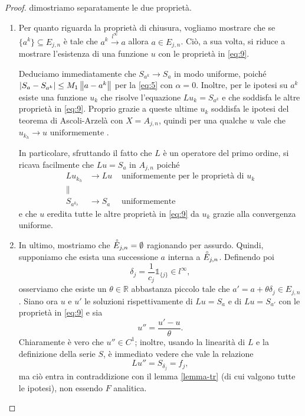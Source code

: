 \newpage
\begin{proof} 
dimostriamo separatamente le due proprietà.
\begin{enumerate}
\item
Per quanto riguarda la proprietà di chiusura, vogliamo mostrare che se $\{a^k\}\subseteq E_{j,n}$ è tale che $a^k \xrightarrow{l^\infty} a$ allora $a \in E_{j,n}$. Ciò, a sua volta, si riduce a mostrare l'esistenza di una funzione $u$ con le proprietà in \eqref{eq:9}.

Deduciamo immediatamente che $S_{a^k} \rightarrow S_a$ in modo uniforme, poiché $\left|S_a - S_{a^k}\right| \leq M_1 \left\lVert a-a^k\right\rVert$ per la \eqref{eq:5} con $\alpha = 0$. Inoltre, per le ipotesi su $a^k$ esiste una funzione $u_k$ che risolve l'equazione $Lu_k=S_{a^k}$ e che soddisfa le altre proprietà in \eqref{eq:9}. Proprio grazie a queste ultime $u_k$ soddisfa le ipotesi del teorema di Ascoli-Arzelà con $X=A_{j,n}$, quindi per una qualche $u$ vale che $u_{k_h} \rightarrow u \text{ uniformemente }$.

In particolare, sfruttando il fatto che $L$ è un operatore del primo ordine, si ricava facilmente che $Lu=S_a$ in $A_{j,n}$ poiché
\begin{align*}
Lu_{k_h}& \rightarrow Lu &\text{ uniformemente per le proprietà di } u_k\\
\lVert \quad &  &\\
S_{a^{k_h}}& \rightarrow S_a &\text{ uniformemente }
\end{align*}
e che $u$ eredita tutte le altre proprietà in \eqref{eq:9} da $u_k$ grazie alla convergenza uniforme.
 
\item
In ultimo, mostriamo che $\accentset{\circ}{E}_{j,n}=\emptyset$ ragionando per assurdo. Quindi, supponiamo che esista una successione $a$ interna a $\accentset{\circ}{E}_{j,n}$. Definendo poi
$$\delta_j = \frac{1}{c_j} \mathds{1}_{\{j\}} \in l^\infty,$$
osserviamo che esiste un $\theta \in \mathbb{R}$ abbastanza piccolo tale che $a'=a+\theta \delta_j \in E_{j,n}$.
Siano ora $u$ e $u'$ le soluzioni rispettivamente di $Lu=S_a$ e di $Lu=S_{a'}$ con le proprietà in \eqref{eq:9} e sia
$$u''=\frac{u'-u}{\theta}.$$ 
Chiaramente è vero che $u'' \in C^1$; inoltre, usando la linearità di $L$ e la definizione della serie $S$, è immediato vedere che vale la relazione $$Lu''=S_{\delta_j}=f_j,$$ ma ciò entra in contraddizione con il lemma \ref{lemma-tr} (di cui valgono tutte le ipotesi), non essendo $F$ analitica. 
\end{enumerate}
\end{proof}

